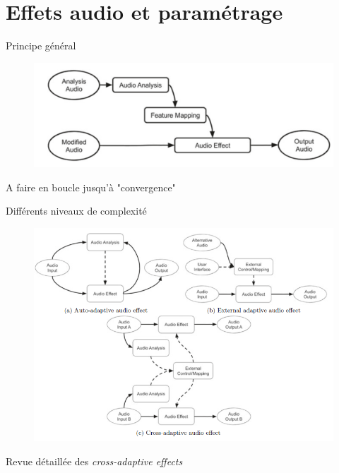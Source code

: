 \documentclass[9pt, aspectratio=169]{beamer}
\begin{document}
\section{Effets audio et paramétrage}
\begin{frame}{Principe général} %
\begin{figure}
\includegraphics[width=.7\textwidth]{fig/adaptive_audio_effect_typical.png}
\end{figure}

A faire en boucle jusqu'à "convergence"

\end{frame}

\begin{frame}{Différents niveaux de complexité} %
\begin{figure}
\includegraphics[width=.6\textwidth]{fig/mixauto_audiomanip.png}
\end{figure}

Revue détaillée des \emph{cross-adaptive effects} \cite{reiss_applications_2018}

\end{frame}
\end{document}
